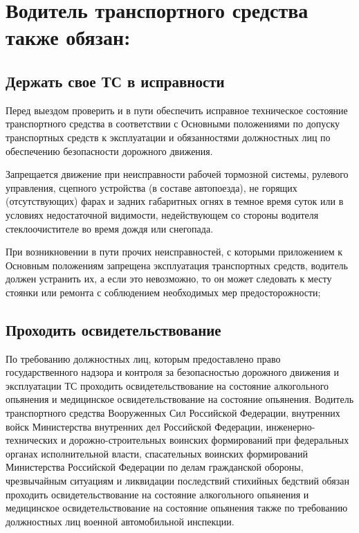 \documentclass[russian,english,12pt,a4paper,reqno,dviphfm,oneside]{book}
\begin{document}
{\section[Другие обязательства]{Водитель транспортного средства также обязан:}

\subsection[Исправность ТС]{Держать свое ТС в исправности} Перед выездом проверить и в пути обеспечить исправное техническое состояние транспортного средства в соответствии с Основными положениями по допуску транспортных средств к эксплуатации и обязанностями должностных лиц по обеспечению безопасности дорожного движения.

Запрещается движение при неисправности рабочей тормозной системы, рулевого управления, сцепного устройства (в составе автопоезда), не горящих (отсутствующих) фарах и задних габаритных огнях в темное время суток или в условиях недостаточной видимости, недействующем со стороны водителя стеклоочистителе во время дождя или снегопада.

При возникновении в пути прочих неисправностей, с которыми приложением к Основным положениям запрещена эксплуатация транспортных средств, водитель должен устранить их, а если это невозможно, то он может следовать к месту стоянки или ремонта с соблюдением необходимых мер предосторожности;

\subsection[Освидетельствоание]{Проходить освидетельствование} По требованию должностных лиц, которым предоставлено право государственного надзора и контроля за безопасностью дорожного движения и эксплуатации ТС проходить освидетельствование на состояние алкогольного опьянения и медицинское освидетельствование на состояние опьянения. Водитель транспортного средства Вооруженных Сил Российской Федерации, внутренних войск Министерства внутренних дел Российской Федерации, инженерно-технических и дорожно-строительных воинских формирований при федеральных органах исполнительной власти, спасательных воинских формирований Министерства Российской Федерации по делам гражданской обороны, чрезвычайным ситуациям и ликвидации последствий стихийных бедствий обязан проходить освидетельствование на состояние алкогольного опьянения и медицинское освидетельствование на состояние опьянения также по требованию должностных лиц военной автомобильной инспекции.

}
\end{document}
